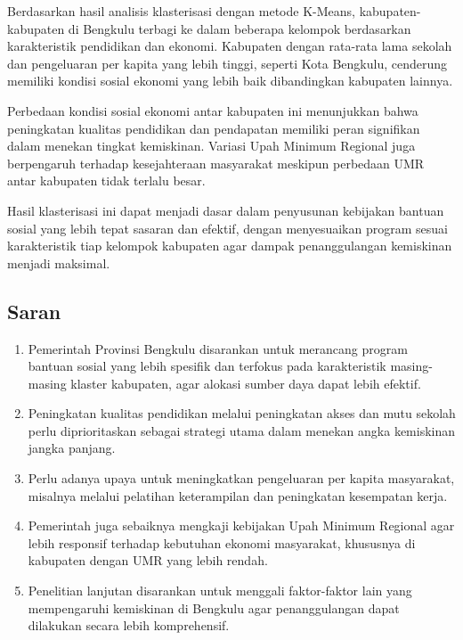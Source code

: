 \documentclass[12pt,a4paper]{article}
\begin{document}
\begin{multicols}{2}
Berdasarkan hasil analisis klasterisasi dengan metode K-Means, kabupaten-kabupaten di Bengkulu terbagi ke dalam beberapa kelompok berdasarkan karakteristik pendidikan dan ekonomi. Kabupaten dengan rata-rata lama sekolah dan pengeluaran per kapita yang lebih tinggi, seperti Kota Bengkulu, cenderung memiliki kondisi sosial ekonomi yang lebih baik dibandingkan kabupaten lainnya. 

Perbedaan kondisi sosial ekonomi antar kabupaten ini menunjukkan bahwa peningkatan kualitas pendidikan dan pendapatan memiliki peran signifikan dalam menekan tingkat kemiskinan. Variasi Upah Minimum Regional juga berpengaruh terhadap kesejahteraan masyarakat meskipun perbedaan UMR antar kabupaten tidak terlalu besar.

Hasil klasterisasi ini dapat menjadi dasar dalam penyusunan kebijakan bantuan sosial yang lebih tepat sasaran dan efektif, dengan menyesuaikan program sesuai karakteristik tiap kelompok kabupaten agar dampak penanggulangan kemiskinan menjadi maksimal.

\subsection{Saran}

\begin{enumerate}
    \item Pemerintah Provinsi Bengkulu disarankan untuk merancang program bantuan sosial yang lebih spesifik dan terfokus pada karakteristik masing-masing klaster kabupaten, agar alokasi sumber daya dapat lebih efektif.
    \item Peningkatan kualitas pendidikan melalui peningkatan akses dan mutu sekolah perlu diprioritaskan sebagai strategi utama dalam menekan angka kemiskinan jangka panjang.
    \item Perlu adanya upaya untuk meningkatkan pengeluaran per kapita masyarakat, misalnya melalui pelatihan keterampilan dan peningkatan kesempatan kerja.
    \item Pemerintah juga sebaiknya mengkaji kebijakan Upah Minimum Regional agar lebih responsif terhadap kebutuhan ekonomi masyarakat, khususnya di kabupaten dengan UMR yang lebih rendah.
    \item Penelitian lanjutan disarankan untuk menggali faktor-faktor lain yang mempengaruhi kemiskinan di Bengkulu agar penanggulangan dapat dilakukan secara lebih komprehensif.
\end{enumerate}


\renewcommand{\refname}{Daftar Pustaka}


\end{multicols}
\end{document}
